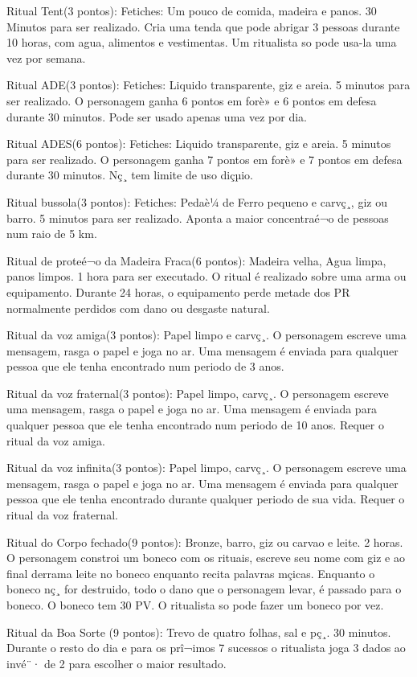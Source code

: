  

	 Ritual Tent(3 pontos): Fetiches: Um pouco de comida, madeira e panos. 30 Minutos para ser realizado. Cria uma tenda que pode abrigar 3 pessoas durante 10 horas, com agua, alimentos e vestimentas. Um ritualista so pode usa-la uma vez por semana.
 
 	 Ritual ADE(3 pontos): Fetiches: Liquido transparente, giz e areia. 5 minutos para ser realizado. O personagem ganha 6 pontos em forè» e 6 pontos em defesa durante 30 minutos. Pode ser usado apenas uma vez por dia.
 
 	 Ritual ADES(6 pontos): Fetiches: Liquido transparente, giz e areia. 5 minutos para ser realizado. O personagem ganha 7 pontos em forè» e 7 pontos em defesa durante 30 minutos. Nç¸ tem limite de uso diçµio.
 
 	 Ritual bussola(3 pontos): Fetiches: Pedaè¼ de Ferro pequeno e carvç¸, giz ou barro. 5 minutos para ser realizado. Aponta a maior concentraé¬o de pessoas num raio de 5 km.
 
 	 Ritual de proteé¬o da Madeira Fraca(6 pontos): Madeira velha, Agua limpa, panos limpos. 1 hora para ser executado. O ritual é realizado
 sobre uma arma ou equipamento. Durante 24 horas, o equipamento perde metade dos PR normalmente perdidos com dano ou desgaste natural.
 
 	 Ritual da voz amiga(3 pontos): Papel limpo e carvç¸. O personagem escreve uma mensagem, rasga o papel e joga no ar. Uma mensagem é enviada para qualquer pessoa que ele tenha encontrado num periodo de 3 anos. 
 
 	 Ritual da voz fraternal(3 pontos): Papel limpo, carvç¸. O personagem escreve uma mensagem, rasga o papel e joga no ar. Uma mensagem é enviada para qualquer pessoa que ele tenha encontrado num periodo de 10 anos. Requer o ritual da voz amiga.
 
 	 Ritual da voz infinita(3 pontos): Papel limpo, carvç¸. O personagem escreve uma mensagem, rasga o papel e joga no ar. Uma mensagem é enviada para qualquer pessoa que ele tenha encontrado durante qualquer periodo de sua vida. Requer o ritual da voz fraternal.
 
 	 Ritual do Corpo fechado(9 pontos): Bronze, barro, giz ou carvao e leite. 2 horas. O personagem constroi um boneco com os rituais, escreve seu nome com giz e ao final derrama leite no boneco enquanto recita palavras mçicas. Enquanto o boneco nç¸ for destruido, todo o dano que o personagem levar, é passado para o boneco. O boneco tem 30 PV. O ritualista so pode fazer um boneco por vez.
 
 	 Ritual da Boa Sorte (9 pontos): Trevo de quatro folhas, sal e pç¸. 30 minutos. Durante o resto do dia e para os prî¬imos 7 sucessos o ritualista joga 3 dados ao invé¨· de 2 para escolher o maior resultado.

 